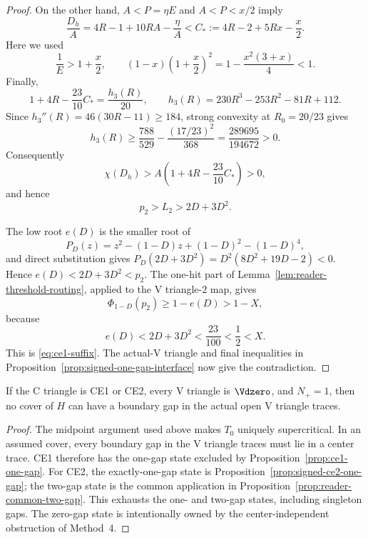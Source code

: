 \begin{proof}
On the other hand, $A<P=\eta E$ and $A<P<x/2$ imply
\[
 \frac{D_h}{A}
 =4R-1+10RA-\frac{\eta}{A}
 <C_*:=4R-2+5Rx-\frac x2.
\]
Here we used
\[
 \frac1E>1+\frac x2,
 \qquad
 (1-x)\left(1+\frac x2\right)^2
 =1-\frac{x^2(3+x)}4<1.
\]
Finally,
\[
 1+4R-\frac{23}{10}C_*=\frac{h_3(R)}{20},
 \qquad
 h_3(R)=230R^3-253R^2-81R+112.
\]
Since $h_3''(R)=46(30R-11)\ge184$, strong convexity at $R_0=20/23$
gives
\[
 h_3(R)\ge
 \frac{788}{529}-\frac{(17/23)^2}{368}
 =\frac{289695}{194672}>0.
\]
Consequently
\[
 \chi(D_h)>A\left(1+4R-\frac{23}{10}C_*\right)>0,
\]
and hence
\[
 p_2>L_2>2D+3D^2.
\]

The low root $e(D)$ is the smaller root of
\[
 P_D(z)=z^2-(1-D)z+(1-D)^2-(1-D)^4,
\]
and direct substitution gives
$P_D(2D+3D^2)=D^2(8D^2+19D-2)<0$. Hence
$e(D)<2D+3D^2<p_2$.  The one-hit part of
Lemma~\ref{lem:reader-threshold-routing}, applied to the V triangle-$2$ map, gives
\[
 \Phi_{1-D}(p_2)\ge1-e(D)>1-X,
\]
because
\[
 e(D)<2D+3D^2<\frac{23}{100}<\frac12<X.
\]
This is \eqref{eq:ce1-suffix}.  The actual-V triangle and final inequalities in
Proposition~\ref{prop:signed-one-gap-interface} now give the contradiction.
\end{proof}

\begin{proposition}[nonempty gap all-$\Vdzero$, $N_+=1$]
\label{prop:nplus-one-all-vd0}
If the C triangle is CE1 or CE2, every V triangle is $\Vdzero$, and
$N_+=1$, then no cover of $H$ can have a boundary gap in the actual open
V triangle traces.
\end{proposition}

\begin{proof}
The midpoint argument used above makes $T_0$ uniquely supercritical.  In an
assumed cover, every boundary gap in the V triangle traces must lie in a
center trace.  CE1 therefore has the one-gap state excluded by
Proposition~\ref{prop:ce1-one-gap}.  For CE2, the exactly-one-gap state is
Proposition~\ref{prop:signed-ce2-one-gap}; the two-gap state is the common
application in Proposition~\ref{prop:reader-common-two-gap}.  This
exhausts the one- and two-gap states, including singleton gaps.  The zero-gap
state is intentionally owned by the center-independent obstruction of
Method~4.
\end{proof}
